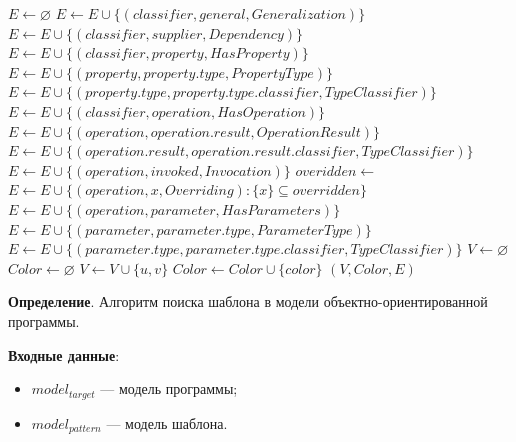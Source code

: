 \begin{algorithmic}
    \State $E \gets \varnothing$
            \State $E \gets E \cup \{ ( classifier, general, Generalization ) \}$
        \EndFor
            \State $E \gets E \cup \{ ( classifier, supplier, Dependency ) \}$
        \EndFor
            \State $E \gets E \cup \{ ( classifier, property, HasProperty ) \}$
            \State $E \gets E \cup \{ ( property, property.type, PropertyType ) \}$
            \State $E \gets E \cup \{ ( property.type, property.type.classifier, TypeClassifier ) \}$
        \EndFor
            \State $E \gets E \cup \{ ( classifier, operation, HasOperation ) \}$
                \State $E \gets E \cup \{ ( operation, operation.result, OperationResult ) \}$
                \State $E \gets E \cup \{ ( operation.result, operation.result.classifier, TypeClassifier ) \}$
            \EndIf
                \State $E \gets E \cup \{ ( operation, invoked, Invocation ) \}$
            \EndFor
            \State $overidden \gets$ 
                \State $E \gets E \cup \{ ( operation, x, Overriding ) : \{ x \} \subseteq overridden \}$
            \EndIf
                \State $E \gets E \cup \{ ( operation, parameter, HasParameters ) \}$
                \State $E \gets E \cup \{ ( parameter, parameter.type, ParameterType ) \}$
                \State $E \gets E \cup \{ ( parameter.type, parameter.type.classifier, TypeClassifier ) \}$
            \EndFor
        \EndFor
    \EndFor
    \State $V \gets \varnothing$
    \State $Color \gets \varnothing$
        \State $V \gets V \cup \{ u, v \}$
        \State $Color \gets Color \cup \{ color \}$
    \EndFor
    \State \Return $(V, Color, E)$
\EndFunction
\end{algorithmic}

\textbf{Определение}. Алгоритм поиска шаблона в модели объектно-ориентированной программы.

\textbf{Входные данные}:
\begin{itemize}
\item $model_{target}$ --- модель программы;
\item $model_{pattern}$ --- модель шаблона.
\end{itemize}

